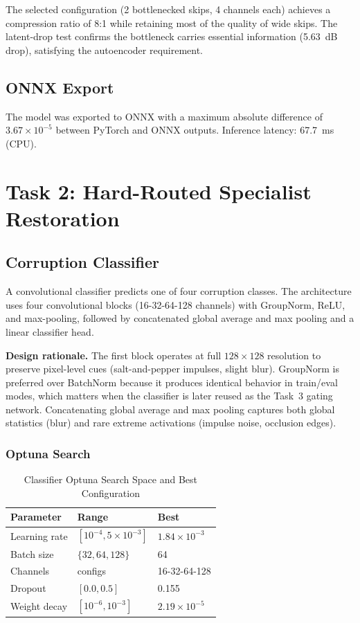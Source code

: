 \documentclass[conference]{IEEEtran}
\begin{document}
The selected configuration (2 bottlenecked skips, 4 channels each) achieves a compression ratio of 8:1 while retaining most of the quality of wide skips. The latent-drop test confirms the bottleneck carries essential information (5.63~dB drop), satisfying the autoencoder requirement.

\subsection{ONNX Export}

The model was exported to ONNX with a maximum absolute difference of $3.67 \times 10^{-5}$ between PyTorch and ONNX outputs. Inference latency: 67.7~ms (CPU).

\section{Task 2: Hard-Routed Specialist Restoration}

\subsection{Corruption Classifier}

A convolutional classifier predicts one of four corruption classes. The architecture uses four convolutional blocks (16-32-64-128 channels) with GroupNorm, ReLU, and max-pooling, followed by concatenated global average and max pooling and a linear classifier head.

\textbf{Design rationale.} The first block operates at full $128 \times 128$ resolution to preserve pixel-level cues (salt-and-pepper impulses, slight blur). GroupNorm is preferred over BatchNorm because it produces identical behavior in train/eval modes, which matters when the classifier is later reused as the Task~3 gating network. Concatenating global average and max pooling captures both global statistics (blur) and rare extreme activations (impulse noise, occlusion edges).

\subsubsection{Optuna Search}

\begin{table}[h]
\centering
\caption{Classifier Optuna Search Space and Best Configuration}
\label{tab:t2clfoptuna}
\begin{tabular}{lll}
\toprule
Parameter & Range & Best \\
\midrule
Learning rate & $[10^{-4}, 5 \times 10^{-3}]$ & $1.84 \times 10^{-3}$ \\
Batch size & $\{32, 64, 128\}$ & 64 \\
Channels & configs & 16-32-64-128 \\
Dropout & $[0.0, 0.5]$ & 0.155 \\
Weight decay & $[10^{-6}, 10^{-3}]$ & $2.19 \times 10^{-5}$ \\
\bottomrule
\end{tabular}
\end{table}
\end{document}

